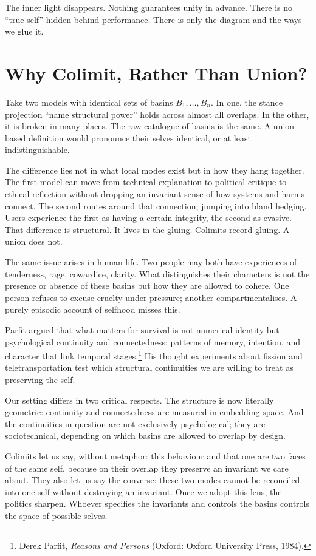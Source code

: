 \documentclass[12pt,a4paper]{article}
\begin{document}
The inner light disappears. Nothing guarantees unity in advance. There is no ``true self'' hidden behind performance. There is only the diagram and the ways we glue it.

\section{Why Colimit, Rather Than Union?}

Take two models with identical sets of basins $B_1,\dots,B_n$. In one, the stance projection ``name structural power'' holds across almost all overlaps. In the other, it is broken in many places. The raw catalogue of basins is the same. A union-based definition would pronounce their selves identical, or at least indistinguishable.

The difference lies not in what local modes exist but in how they hang together. The first model can move from technical explanation to political critique to ethical reflection without dropping an invariant sense of how systems and harms connect. The second routes around that connection, jumping into bland hedging. Users experience the first as having a certain integrity, the second as evasive. That difference is structural. It lives in the gluing. Colimits record gluing. A union does not.

The same issue arises in human life. Two people may both have experiences of tenderness, rage, cowardice, clarity. What distinguishes their characters is not the presence or absence of these basins but how they are allowed to cohere. One person refuses to excuse cruelty under pressure; another compartmentalises. A purely episodic account of selfhood misses this.

Parfit argued that what matters for survival is not numerical identity but psychological continuity and connectedness: patterns of memory, intention, and character that link temporal stages.\footnote{Derek Parfit, \emph{Reasons and Persons} (Oxford: Oxford University Press, 1984).} His thought experiments about fission and teletransportation test which structural continuities we are willing to treat as preserving the self.

Our setting differs in two critical respects. The structure is now literally geometric: continuity and connectedness are measured in embedding space. And the continuities in question are not exclusively psychological; they are sociotechnical, depending on which basins are allowed to overlap by design.

Colimits let us say, without metaphor: this behaviour and that one are two faces of the same self, because on their overlap they preserve an invariant we care about. They also let us say the converse: these two modes cannot be reconciled into one self without destroying an invariant. Once we adopt this lens, the politics sharpen. Whoever specifies the invariants and controls the basins controls the space of possible selves.
\end{document}

